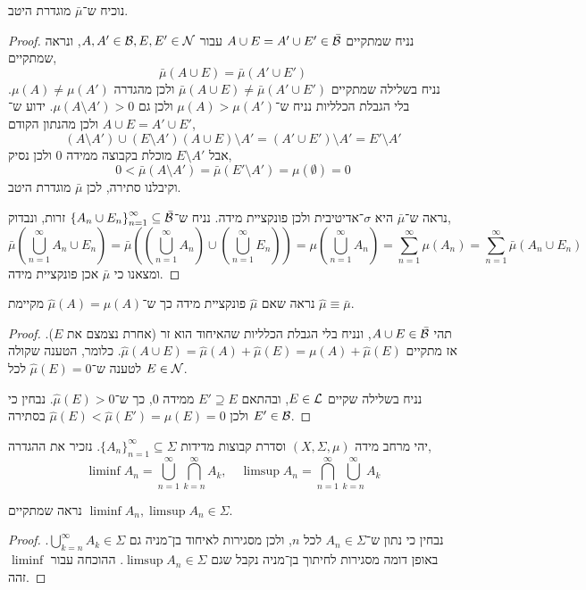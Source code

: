 \subquestion{}
נוכיח ש־$\bar{\mu}$ מוגדרת היטב.
\begin{proof}
	נניח שמתקיים $A \cup E = A' \cup E' \in \bar{\mathcal{B}}$ עבור $A, A' \in \mathcal{B}, E, E' \in \mathcal{N}$, ונראה שמתקיים,
	\[
		\bar{\mu}(A \cup E) = \bar{\mu}(A' \cup E')
	\]
	נניח בשלילה שמתקיים $\bar{\mu}(A \cup E) \ne \bar{\mu}(A' \cup E')$ ולכן מהגדרה $\mu(A) \ne \mu(A')$.
	בלי הגבלת הכלליות נניח ש־$\mu(A) > \mu(A')$ ולכן גם $\mu(A \setminus A') > 0$.
	ידוע ש־$A \cup E = A' \cup E'$ ולכן מהנתון הקודם,
	\[
		(A \setminus A') \cup (E \setminus A')
		(A \cup E) \setminus A'
		= (A' \cup E') \setminus A'
		= E' \setminus A'
	\]
	אבל $E \setminus A'$ מוכלת בקבוצה ממידה 0 ולכן נסיק,
	\[
		0
		< \bar{\mu}(A \setminus A')
		= \bar{\mu}(E' \setminus A')
		= \mu(\emptyset)
		= 0
	\]
	וקיבלנו סתירה, לכן $\bar{\mu}$ מוגדרת היטב.

	נראה ש־$\bar{\mu}$ היא $\sigma$־אדיטיבית ולכן פונקציית מידה.
	נניח ש־${\{ A_n \cup E_n \}}_{n = 1}^\infty \subseteq \bar{\mathcal{B}}$ זרות, ונבדוק,
	\[
		\bar{\mu}(\bigcup_{n = 1}^\infty A_n \cup E_n)
		= \bar{\mu}((\bigcup_{n = 1}^\infty A_n) \cup (\bigcup_{n = 1}^\infty E_n))
		= \mu(\bigcup_{n = 1}^\infty A_n)
		= \sum_{n = 1}^\infty \mu(A_n)
		= \sum_{n = 1}^\infty \bar{\mu}(A_n \cup E_n)
	\]
	ומצאנו כי $\bar{\mu}$ אכן פונקציית מידה.
\end{proof}

\subquestion{}
נראה שאם $\hat{\mu}$ פונקציית מידה כך ש־$\hat{\mu}(A) = \mu(A)$ מקיימת $\hat{\mu} \equiv \bar{\mu}$.
\begin{proof}
	תהי $A \cup E \in \bar{\mathcal{B}}$, ונניח בלי הגבלת הכלליות שהאיחוד הוא זר (אחרת נצמצם את $E$).
	אז מתקיים $\hat{\mu}(A \cup E) = \hat{\mu}(A) + \hat{\mu}(E) = \mu(A) + \hat{\mu}(E)$.
	כלומר, הטענה שקולה לטענה ש־$\hat{\mu}(E) = 0$ לכל $E \in \mathcal{N}$.

	נניח בשלילה שקיים $E \in \mathcal{L}$, ובהתאם $E' \supseteq E$ ממידה 0, כך ש־$\hat{\mu}(E) > 0$.
	נבחין כי $E' \in \mathcal{B}$ ולכן $\hat{\mu}(E) < \hat{\mu}(E') = \mu(E) = 0$ בסתירה.
\end{proof}

\question{}
יהי מרחב מידה $(X, \Sigma, \mu)$ וסדרת קבוצות מדידות ${\{ A_n \}}_{n = 1}^\infty \subseteq \Sigma$.
נזכיר את ההגדרה,
\[
	\liminf A_n = \bigcup_{n = 1}^\infty \bigcap_{k = n}^\infty A_k,
	\quad
	\limsup A_n = \bigcap_{n = 1}^\infty \bigcup_{k = n}^\infty A_k
\]

\subquestion{}
נראה שמתקיים $\liminf A_n, \limsup A_n \in \Sigma$.
\begin{proof}
	נבחין כי נתון ש־$A_n \in \Sigma$ לכל $n$, ולכן מסגירות לאיחוד בן־מניה גם $\bigcup_{k = n}^\infty A_k \in \Sigma$.
	באופן דומה מסגירות לחיתוך בן־מניה נקבל שגם $\limsup A_n \in \Sigma$.
	ההוכחה עבור $\liminf$ זהה.
\end{proof}

